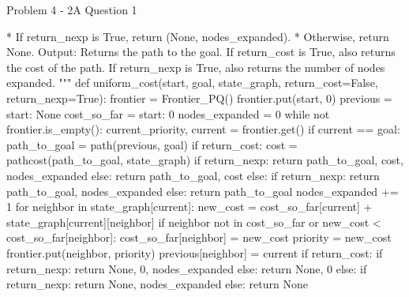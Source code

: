 \begin{problem}{Problem 4 - 2A Question 1}
\begin{highlight}[Solution]
\begin{code}[Python]
                    * If return_nexp is True, return (None, nodes_expanded).
                    * Otherwise, return None.
        Output:
            Returns the path to the goal.
            If return_cost is True, also returns the cost of the path.
            If return_nexp is True, also returns the number of nodes expanded.
    """
    def uniform_cost(start, goal, state_graph, return_cost=False, return_nexp=True):
        frontier = Frontier_PQ()
        frontier.put(start, 0)
        previous = {start: None}
        cost_so_far = {start: 0}
        nodes_expanded = 0
        while not frontier.is_empty():
            current_priority, current = frontier.get()
            if current == goal:
                path_to_goal = path(previous, goal)
                if return_cost:
                    cost = pathcost(path_to_goal, state_graph)
                    if return_nexp:
                        return path_to_goal, cost, nodes_expanded
                    else:
                        return path_to_goal, cost
                else:
                    if return_nexp:
                        return path_to_goal, nodes_expanded
                    else:
                        return path_to_goal
            nodes_expanded += 1
            for neighbor in state_graph[current]:
                new_cost = cost_so_far[current] + state_graph[current][neighbor]
                if neighbor not in cost_so_far or new_cost < cost_so_far[neighbor]:
                    cost_so_far[neighbor] = new_cost
                    priority = new_cost
                    frontier.put(neighbor, priority)
                    previous[neighbor] = current
        if return_cost:
            if return_nexp:
                return None, 0, nodes_expanded
            else:
                return None, 0
        else:
            if return_nexp:
                return None, nodes_expanded
            else:
                return None
    \end{code}
    \end{highlight}
\end{problem}

